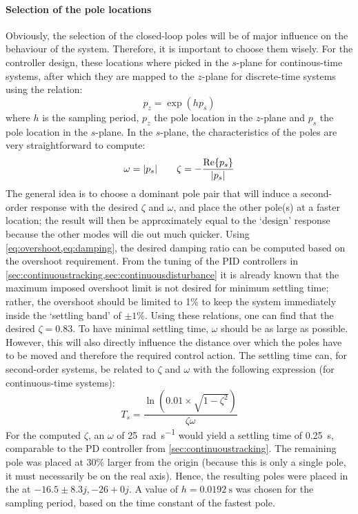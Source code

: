 \paragraph{Selection of the pole locations} Obviously, the selection of the closed-loop poles will be of major influence on the behaviour of the system. Therefore, it is important to choose them wisely. For the controller design, these locations where picked in the $s$-plane for continous-time systems, after which they are mapped to the $z$-plane for discrete-time systems using the relation:
$$ p_z = \exp(hp_s)$$
where $h$ is the sampling period, $p_z$ the pole location in the $z$-plane and $p_s$ the pole location in the $s$-plane. In the $s$-plane, the characteristics of the poles are very straightforward to compute:
$$ \omega = \abs{p_s} \qquad \zeta = -\frac{\Re{p_s}}{\abs{p_s}}$$
The general idea is to choose a dominant pole pair that will induce a second-order response with the desired $\zeta$ and $\omega$, and place the other pole(s) at a faster location; the result will then be approximately equal to the `design' response because the other modes will die out much quicker.
Using \cref{eq:overshoot,eq:damping}, the desired damping ratio can be computed based on the overshoot requirement. From the tuning of the PID controllers in \cref{sec:continuoustracking,sec:continuousdisturbance} it is already known that the maximum imposed overshoot limit is not desired for minimum settling time; rather, the overshoot should be limited to 1\% to keep the system immediately inside the `settling band' of $\pm 1\%$. Using these relations, one can find that the desired $\zeta = 0.83$. To have minimal settling time, $\omega$ should be as large as possible. However, this will also directly influence the distance over which the poles have to be moved and therefore the required control action. The settling time can, for second-order systems, be related to $\zeta$ and $\omega$ with the following expression (for continuous-time systems): \cite{nise}
$$ T_s = \frac{\ln(0.01\times\sqrt{1 - \zeta^2})}{\zeta\omega}$$
For the computed $\zeta$, an $\omega$ of \SI{25}{\radian\per\second} would yield a settling time of \SI{0.25}{\second}, comparable to the PD controller from \cref{sec:continuoustracking}. The remaining pole was placed at 30\% larger from the origin (because this is only a single pole, it must necessarily be on the real axis).
Hence, the resulting poles were placed in the at $-16.5 \pm 8.3j, -26 + 0j$. A value of $h = \SI{0.0192}{\second}$ was chosen for the sampling period, based on the time constant of the fastest pole.

